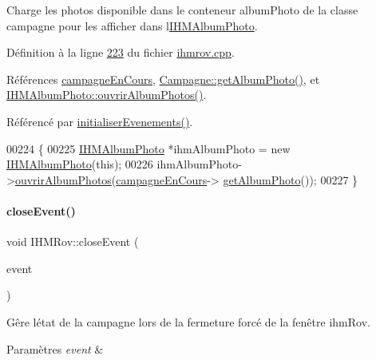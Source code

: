 Charge les photos disponible dans le conteneur album\+Photo de la classe campagne pour les afficher dans l\textquotesingle{}\hyperlink{class_i_h_m_album_photo}{I\+H\+M\+Album\+Photo}. 



Définition à la ligne \hyperlink{ihmrov_8cpp_source_l00223}{223} du fichier \hyperlink{ihmrov_8cpp_source}{ihmrov.\+cpp}.



Références \hyperlink{ihmrov_8h_source_l00045}{campagne\+En\+Cours}, \hyperlink{campagne_8cpp_source_l00070}{Campagne\+::get\+Album\+Photo()}, et \hyperlink{ihmalbumphoto_8cpp_source_l00038}{I\+H\+M\+Album\+Photo\+::ouvrir\+Album\+Photos()}.



Référencé par \hyperlink{ihmrov_8cpp_source_l00098}{initialiser\+Evenements()}.


\begin{DoxyCode}
00224 \{
00225     \hyperlink{class_i_h_m_album_photo}{IHMAlbumPhoto} *ihmAlbumPhoto = \textcolor{keyword}{new} \hyperlink{class_i_h_m_album_photo}{IHMAlbumPhoto}(\textcolor{keyword}{this});
00226     ihmAlbumPhoto->\hyperlink{class_i_h_m_album_photo_a5aa9a9c1b04e00eaec1581e92649535f}{ouvrirAlbumPhotos}(\hyperlink{class_i_h_m_rov_af0475e935531b7331f097ae13d07989b}{campagneEnCours}->
      \hyperlink{class_campagne_abec90fcbc0c4ded45caaac9adb454add}{getAlbumPhoto}());
00227 \}
\end{DoxyCode}
\mbox{\label{class_i_h_m_rov_a68b11818797a6444a8fab81b7b45f670}} 
\paragraph{\texorpdfstring{close\+Event()}{closeEvent()}}
{\footnotesize\ttfamily void I\+H\+M\+Rov\+::close\+Event (\begin{DoxyParamCaption}\item[{Q\+Close\+Event $\ast$}]{event }\end{DoxyParamCaption})\hspace{0.3cm}{\ttfamily [protected]}}



Gêre l\textquotesingle{}état de la campagne lors de la fermeture forcé de la fenêtre ihm\+Rov. 


\begin{DoxyParams}{Paramètres}
{\em event} & \\
\hline
\end{DoxyParams}


